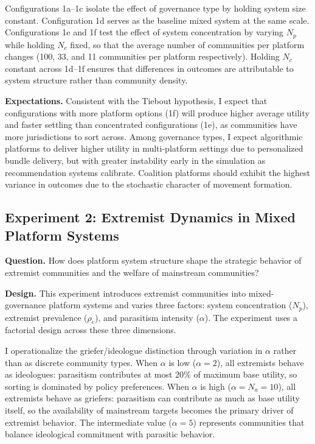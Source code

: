\documentclass{article}
\begin{document}
Configurations 1a--1c isolate the effect of governance type by holding system size constant. Configuration 1d serves as the baseline mixed system at the same scale. Configurations 1e and 1f test the effect of system concentration by varying $N_p$ while holding $N_c$ fixed, so that the average number of communities per platform changes (100, 33, and 11 communities per platform respectively). Holding $N_c$ constant across 1d--1f ensures that differences in outcomes are attributable to system structure rather than community density.

\textbf{Expectations.} Consistent with the Tiebout hypothesis, I expect that configurations with more platform options (1f) will produce higher average utility and faster settling than concentrated configurations (1e), as communities have more jurisdictions to sort across. Among governance types, I expect algorithmic platforms to deliver higher utility in multi-platform settings due to personalized bundle delivery, but with greater instability early in the simulation as recommendation systems calibrate. Coalition platforms should exhibit the highest variance in outcomes due to the stochastic character of movement formation.

\subsection{Experiment 2: Extremist Dynamics in Mixed Platform Systems}
\label{sec:exp2}

\textbf{Question.} How does platform system structure shape the strategic behavior of extremist communities and the welfare of mainstream communities?

\textbf{Design.} This experiment introduces extremist communities into mixed-governance platform systems and varies three factors: system concentration ($N_p$), extremist prevalence ($\rho_e$), and parasitism intensity ($\alpha$). The experiment uses a factorial design across these three dimensions.

I operationalize the griefer/ideologue distinction through variation in $\alpha$ rather than as discrete community types. When $\alpha$ is low ($\alpha = 2$), all extremists behave as ideologues: parasitism contributes at most 20\% of maximum base utility, so sorting is dominated by policy preferences. When $\alpha$ is high ($\alpha = N_a = 10$), all extremists behave as griefers: parasitism can contribute as much as base utility itself, so the availability of mainstream targets becomes the primary driver of extremist behavior. The intermediate value ($\alpha = 5$) represents communities that balance ideological commitment with parasitic behavior.
\end{document}
